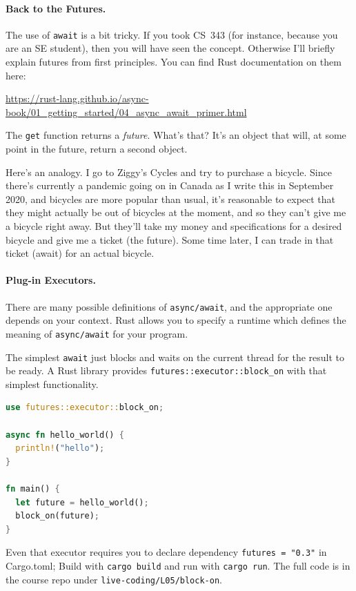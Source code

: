 \documentclass[a4paper]{report}
\begin{document}
\paragraph{Back to the Futures.}
The use of \texttt{await} is a bit tricky. If you took CS~343
(for instance, because you are an SE student), then you will have seen
the concept. Otherwise I'll briefly explain futures from first principles.
You can find Rust documentation on them here:
\begin{center}
\url{https://rust-lang.github.io/async-book/01_getting_started/04_async_await_primer.html}
\end{center}

The \texttt{get} function returns a \emph{future}. What's that?  It's
an object that will, at some point in the future, return a second
object.

Here's an analogy. I go to Ziggy's Cycles and try to purchase a
bicycle. Since there's currently a pandemic going on in Canada as I
write this in September 2020, and bicycles are more popular than
usual, it's reasonable to expect that they might actually be out of
bicycles at the moment, and so they can't
give me a bicycle right away.  But they'll take my money and
specifications for a desired bicycle and give me a ticket (the
future). Some time later, I can trade in that ticket (await) for an
actual bicycle.

\paragraph{Plug-in Executors.}
There are many possible definitions of \texttt{async/await}, and the appropriate
one depends on your context. Rust allows you to specify a runtime
which defines the meaning of \texttt{async/await} for your program.

The simplest \texttt{await} just blocks and waits on the current
thread for the result to be ready. A Rust library
provides \texttt{futures::executor::block\_on} with that
simplest functionality.

\begin{lstlisting}[language=Rust]
use futures::executor::block_on;

async fn hello_world() {
  println!("hello");
}

fn main() {
  let future = hello_world();
  block_on(future);
}
\end{lstlisting}
Even that executor requires you to declare dependency \texttt{futures = "0.3"}
in Cargo.toml; Build with \texttt{cargo build} and run with \texttt{cargo run}. The full code is in the course repo under \texttt{live-coding/L05/block-on}.
\end{document}
